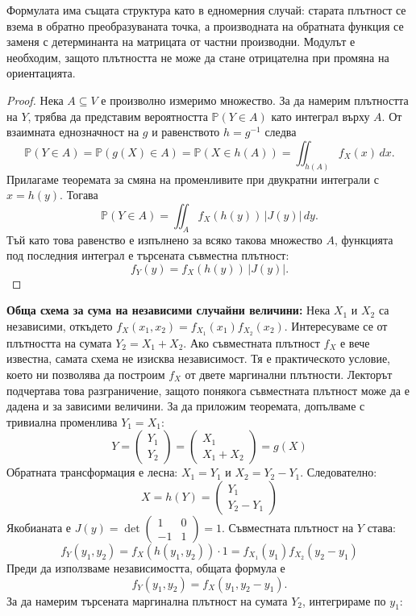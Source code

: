 Формулата има същата структура като в едномерния случай: старата плътност се взема в обратно преобразуваната точка, а производната на обратната функция се заменя с детерминанта на матрицата от частни производни. Модулът е необходим, защото плътността не може да стане отрицателна при промяна на ориентацията.

\begin{proof}
Нека $A\subseteq V$ е произволно измеримо множество. За да намерим плътността на $Y$, трябва да представим вероятността $\mathbb{P}(Y\in A)$ като интеграл върху $A$. От взаимната еднозначност на $g$ и равенството $h=g^{-1}$ следва
\[
\mathbb{P}(Y\in A)
  =\mathbb{P}(g(X)\in A)
  =\mathbb{P}(X\in h(A))
  =\iint_{h(A)} f_X(x)\,dx.
\]
Прилагаме теоремата за смяна на променливите при двукратни интеграли с $x=h(y)$. Тогава
\[
\mathbb{P}(Y\in A)
  =\iint_A f_X(h(y))\,|J(y)|\,dy.
\]
Тъй като това равенство е изпълнено за всяко такова множество $A$, функцията под последния интеграл е търсената съвместна плътност:
\[
f_Y(y)=f_X(h(y))\,|J(y)|.
\]
\end{proof}

\textbf{Обща схема за сума на независими случайни величини:}
Нека $X_1$ и $X_2$ са независими, откъдето $f_X(x_1, x_2) = f_{X_1}(x_1) f_{X_2}(x_2)$. Интересуваме се от плътността на сумата $Y_2 = X_1 + X_2$.
Ако съвместната плътност $f_X$ е вече известна, самата схема не изисква независимост. Тя е практическото условие, което ни позволява да построим $f_X$ от двете маргинални плътности. Лекторът подчертава това разграничение, защото понякога съвместната плътност може да е дадена и за зависими величини.
За да приложим теоремата, допълваме с тривиална променлива $Y_1 = X_1$:
\[
Y = \begin{pmatrix} Y_1 \\ Y_2 \end{pmatrix} = \begin{pmatrix} X_1 \\ X_1 + X_2 \end{pmatrix} = g(X)
\]
Обратната трансформация е лесна: $X_1 = Y_1$ и $X_2 = Y_2 - Y_1$. Следователно:
\[
X = h(Y) = \begin{pmatrix} Y_1 \\ Y_2 - Y_1 \end{pmatrix}
\]
Якобианата е $J(y) = \det \begin{pmatrix} 1 & 0 \\ -1 & 1 \end{pmatrix} = 1$.
Съвместната плътност на $Y$ става:
\[
f_Y(y_1, y_2) = f_X(h(y_1, y_2)) \cdot 1 = f_{X_1}(y_1) f_{X_2}(y_2 - y_1)
\]
Преди да използваме независимостта, общата формула е
\[
f_Y(y_1,y_2)=f_X(y_1,y_2-y_1).
\]
За да намерим търсената маргинална плътност на сумата $Y_2$, интегрираме по $y_1$:

